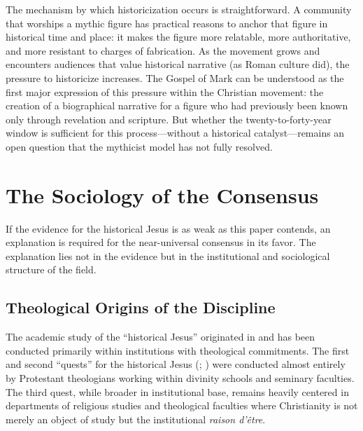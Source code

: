 \documentclass[12pt,oneside]{article}
\begin{document}
The mechanism by which historicization occurs is straightforward.  A
community that worships a mythic figure has practical reasons to anchor
that figure in historical time and place: it makes the figure more
relatable, more authoritative, and more resistant to charges of
fabrication.  As the movement grows and encounters audiences that value
historical narrative (as Roman culture did), the pressure to
historicize increases.  The Gospel of Mark can be understood as the
first major expression of this pressure within the Christian movement:
the creation of a biographical narrative for a figure who had previously
been known only through revelation and scripture.  But whether the
twenty-to-forty-year window is sufficient for this process---without a
historical catalyst---remains an open question that the mythicist model
has not fully resolved.


\section{The Sociology of the Consensus}
\label{sec:sociology}

If the evidence for the historical Jesus is as weak as this paper
contends, an explanation is required for the near-universal consensus
in its favor.  The explanation lies not in the evidence but in the
institutional and sociological structure of the field.

\subsection{Theological Origins of the Discipline}
\label{sec:sociology:origins}

The academic study of the ``historical Jesus'' originated in and
has been conducted primarily within institutions with theological
commitments.  The first and second ``quests'' for the historical Jesus
(\citealt{Schweitzer1906}; \citealt{Kasemann1954}) were conducted
almost entirely by Protestant theologians working within divinity
schools and seminary faculties.  The third quest, while broader in
institutional base, remains heavily centered in departments of religious
studies and theological faculties where Christianity is not merely an
object of study but the institutional \textit{raison d'\^etre}.
\end{document}
